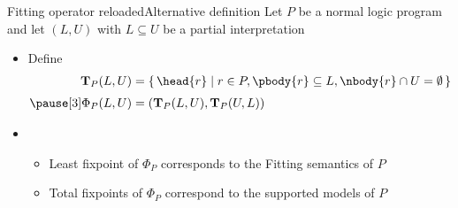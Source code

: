\begin{frame}{Fitting operator reloaded}{Alternative definition}
  Let $P$ be a normal logic program\\
  and let $(L,U)$ with $L\subseteq U$ be a partial interpretation
  \medskip
  \begin{itemize}
  \item <2-> Define
    \begin{align*}
      {\mathbf{T}}_P(L,U)
      & =
      \{\, \head{r} \mid r \in P, \pbody{r} \subseteq L, \nbody{r} \cap U= \emptyset \,\}
      \\[3pt]\pause[3]
      \Phi_P(L,U)
      & =
      ({\mathbf{T}}_P(L,U),{\mathbf{T}}_P(U,L))
    \end{align*}
  \item <4-> 
    \begin{itemize}\normalsize
    \item Least fixpoint  of $\Phi_P$ corresponds to the Fitting semantics of $P$
      \smallskip
    \item Total fixpoints of $\Phi_P$ correspond  to the supported models of $P$
    \end{itemize}
  \end{itemize}
  \nocite{truszczynski18a}
\end{frame}
%
